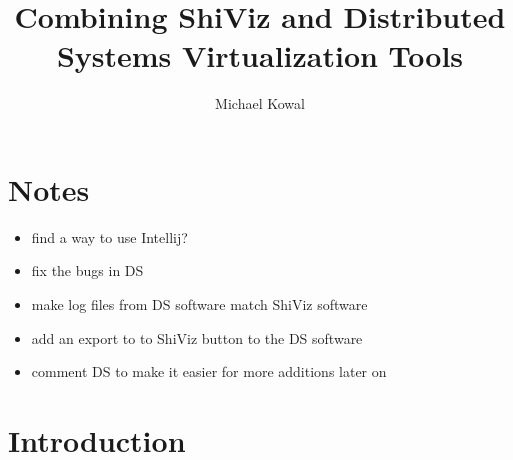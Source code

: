 \documentclass[12pt]{report}
\title{Combining ShiViz and Distributed Systems Virtualization Tools}
\author{Michael Kowal}
\begin{document}
\maketitle
\tableofcontents
\newpage

\section{Notes}
\begin{itemize}
\item find a way to use Intellij? 
\item fix the bugs in DS
\item make log files from DS software match ShiViz software
\item add an export to to ShiViz button to the DS software
\item comment DS to make it easier for more additions later on
\end{itemize}

\section{Introduction}
\end{document}
